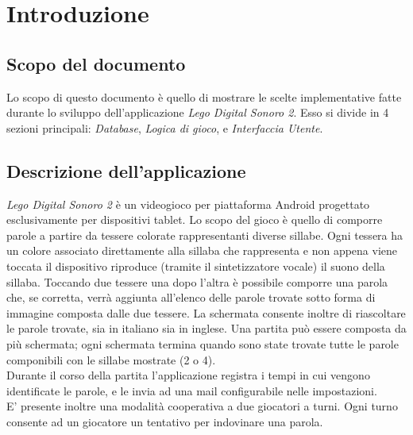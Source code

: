 


\chapter{Introduzione}


\section{Scopo del documento}
Lo scopo di questo documento è quello di mostrare le scelte implementative fatte durante lo sviluppo dell'applicazione \textit{Lego Digital Sonoro 2}. Esso si divide in 4 sezioni principali: \textit{Database}, \textit{Logica di gioco}, e \textit{Interfaccia Utente}.

\section{Descrizione dell'applicazione}
\textit{Lego Digital Sonoro 2} è un videogioco per piattaforma Android progettato esclusivamente per dispositivi tablet. Lo scopo del gioco è quello di comporre parole a partire da tessere colorate rappresentanti diverse sillabe. Ogni tessera ha un colore associato direttamente alla sillaba che rappresenta e non appena viene toccata il dispositivo riproduce (tramite il sintetizzatore vocale) il suono della sillaba. Toccando due tessere una dopo l'altra è possibile comporre una parola che, se corretta, verrà aggiunta all'elenco delle parole trovate sotto forma di immagine composta dalle due tessere. La schermata consente inoltre di riascoltare le parole trovate, sia in italiano sia in inglese. Una partita può essere composta da più schermata; ogni schermata termina quando sono state trovate tutte le parole componibili con le sillabe mostrate (2 o 4).\\
Durante il corso della partita l'applicazione registra i tempi in cui vengono identificate le parole, e le invia ad una mail configurabile nelle impostazioni.\\
E' presente inoltre una modalità cooperativa a due giocatori a turni. Ogni turno consente ad un giocatore un tentativo per indovinare una parola.